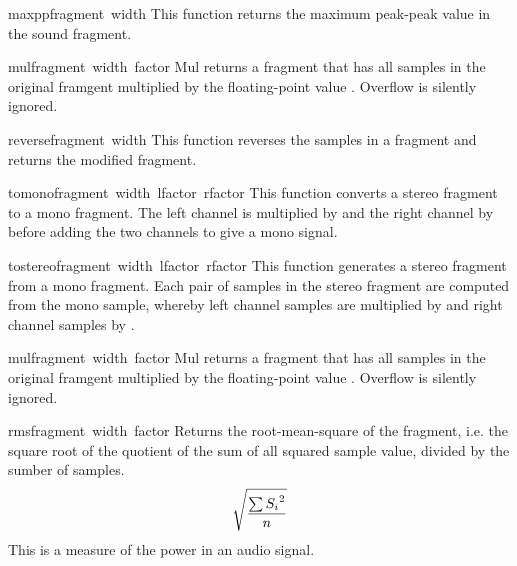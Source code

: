 \begin{funcdesc}{maxpp}{fragment\, width}
This function returns the maximum peak-peak value in the sound fragment.
\end{funcdesc}

\begin{funcdesc}{mul}{fragment\, width\, factor}
Mul returns a fragment that has all samples in the original framgent
multiplied by the floating-point value . Overflow is
silently ignored.
\end{funcdesc}

\begin{funcdesc}{reverse}{fragment\, width}
This function reverses the samples in a fragment and returns the
modified fragment.
\end{funcdesc}

\begin{funcdesc}{tomono}{fragment\, width\, lfactor\, rfactor} 
This function converts a stereo fragment to a mono fragment. The left
channel is multiplied by  and the right channel by
 before adding the two channels to give a mono signal.
\end{funcdesc}

\begin{funcdesc}{tostereo}{fragment\, width\, lfactor\, rfactor}
This function generates a stereo fragment from a mono fragment. Each
pair of samples in the stereo fragment are computed from the mono
sample, whereby left channel samples are multiplied by 
and right channel samples by .
\end{funcdesc}

\begin{funcdesc}{mul}{fragment\, width\, factor}
Mul returns a fragment that has all samples in the original framgent
multiplied by the floating-point value . Overflow is
silently ignored.
\end{funcdesc}

\begin{funcdesc}{rms}{fragment\, width\, factor}
Returns the root-mean-square of the fragment, i.e.
\iftexi
the square root of the quotient of the sum of all squared sample value,
divided by the sumber of samples.
\else
\begin{displaymath}
\catcode`_=8
\sqrt{\frac{\sum{{S_{i}}^{2}}}{n}}
\end{displaymath}
\fi
This is a measure of the power in an audio signal.
\end{funcdesc}

